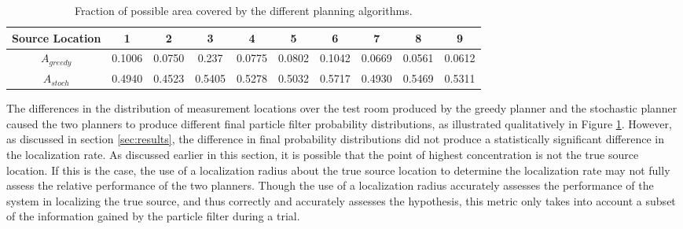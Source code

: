 \documentclass[submit, 12pt]{aiaa-pretty-modified}
\begin{document}
\begin{table}[htb]
\begin{center}
\begin{tabular}{|c||c||c||c||c||c||c||c||c||c|}
\hline
 Source Location & 1 & 2 & 3 & 4 & 5 & 6 & 7 & 8 & 9 \\
\hline \hline
$A_{greedy}$ & 0.1006 & 0.0750 & 0.237 & 0.0775 & 0.0802 & 0.1042 & 0.0669 & 0.0561 & 0.0612 \\
\hline
$A_{stoch}$ & 0.4940 & 0.4523 & 0.5405 & 0.5278 & 0.5032 & 0.5717 & 0.4930 & 0.5469 & 0.5311 \\
\hline
\end{tabular}
\caption{Fraction of possible area covered by the different planning algorithms.}
\label{tab:paths}
\end{center}
\end{table}

The differences in the distribution of measurement locations over the test room
produced by the greedy planner and the stochastic planner caused the
two planners
to produce different final particle filter probability distributions,
as illustrated qualitatively in Figure \ref{tab:paths}.  However, as
discussed in section \ref{sec:results}, the difference in final
probability distributions did not produce a statistically significant
difference in the localization rate.  As discussed earlier in this
section, it is possible that the point of highest concentration is
not the true source location.  If this is the case, the use of a localization radius about
the true source location
to determine the localization rate may not fully assess the
relative performance of the two planners.  Though the use of a
localization radius accurately
assesses the performance of the system in localizing the true source,
and thus correctly and accurately assesses the hypothesis, this metric only takes
into account a subset of the information gained by the particle filter
during a trial.
\end{document}
